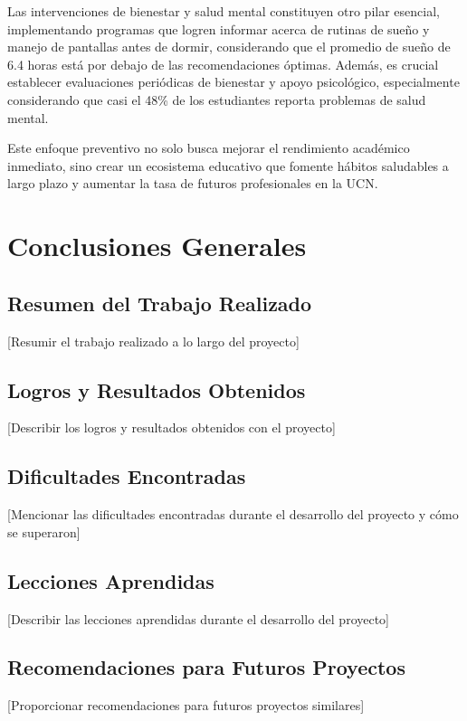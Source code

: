 \documentclass[12pt,letterpaper]{report}
\begin{document}
\space
Las intervenciones de bienestar y salud mental constituyen otro pilar esencial, implementando programas que logren informar acerca de rutinas de sueño y manejo de pantallas antes de dormir, considerando que el promedio de sueño de 6.4 horas está por debajo de las recomendaciones óptimas. Además, es crucial establecer evaluaciones periódicas de bienestar y apoyo psicológico, especialmente considerando que casi el 48\% de los estudiantes reporta problemas de salud mental.

\space
Este enfoque preventivo no solo busca mejorar el rendimiento académico inmediato, sino crear un ecosistema educativo que fomente hábitos saludables a largo plazo y aumentar la tasa de futuros profesionales en la UCN.


\chapter{Conclusiones Generales}

\section{Resumen del Trabajo Realizado}
[Resumir el trabajo realizado a lo largo del proyecto]

\section{Logros y Resultados Obtenidos}
[Describir los logros y resultados obtenidos con el proyecto]

\section{Dificultades Encontradas}
[Mencionar las dificultades encontradas durante el desarrollo del proyecto y cómo se superaron]

\section{Lecciones Aprendidas}
[Describir las lecciones aprendidas durante el desarrollo del proyecto]

\section{Recomendaciones para Futuros Proyectos}
[Proporcionar recomendaciones para futuros proyectos similares]
\end{document}
